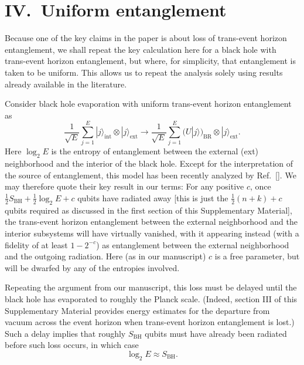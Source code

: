\documentclass[aps,showpacs,prl,12pt]{revtex4}
\begin{document}
\section{IV.\ Uniform entanglement}

Because one of the key claims in the paper is about loss of trans-event
horizon entanglement, we shall repeat the key calculation here
for a black hole with trans-event horizon entanglement, but where,
for simplicity, that entanglement is taken to be uniform. This
allows us to repeat the analysis solely using results already available in
the literature.

Consider black hole evaporation with uniform trans-event
horizon entanglement as
\begin{equation}
\frac{1}{\sqrt{E}}\sum_{j=1}^{E}
|j\rangle_{\text{int}}\otimes|j\rangle_{\text{ext}}\rightarrow
\frac{1}{\sqrt{E}}\sum_{j=1}^{E}
(U|j\rangle)_{\text{BR}} \otimes|j\rangle_{\text{ext}}.
\end{equation}
Here $\log_2 E$ is the entropy of entanglement between the external (ext)
neighborhood and the interior of the black hole. Except for the
interpretation of the source of entanglement, this model has been
recently analyzed by Ref.~[]. We may therefore quote
their key result in our terms: For any positive $c$, once
$\frac{1}{2} S_{\text{BH}}+\frac{1}{2} \log_2 E + c$ qubits have radiated
away [this is just the $\frac{1}{2}(n+k)+c$ qubits required as discussed
in the first section of this Supplementary Material], the 
trans-event horizon entanglement between the external neighborhood and
the interior subsystems will have virtually vanished, with it appearing
instead (with a fidelity of at least $1-2^{-c}$) as entanglement between
the external neighborhood and the outgoing radiation. Here (as in our
manuscript) $c$ is a free parameter, but will be dwarfed by any of the
entropies involved.

Repeating the argument from our manuscript, this loss must be delayed
until the black hole has evaporated to roughly the Planck scale.
(Indeed, section III of this Supplementary Material provides
energy estimates for the departure from vacuum across the event horizon
when trans-event horizon entanglement is lost.) Such a delay implies that
roughly $S_{\text{BH}}$ qubits must have already been radiated before
such loss occurs, in which case
\begin{equation}
\log_2 E\approx S_{\text{BH}}.
\end{equation}
\end{document}

